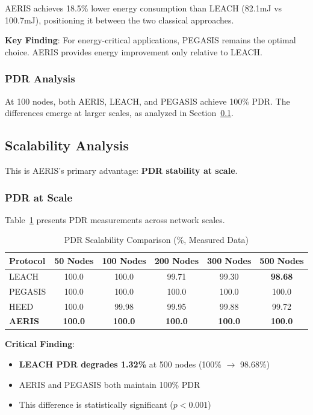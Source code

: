 AERIS achieves 18.5\% lower energy consumption than LEACH (82.1mJ vs 100.7mJ),
positioning it between the two classical approaches.

\textbf{Key Finding}: For energy-critical applications, PEGASIS remains
the optimal choice. AERIS provides energy improvement only relative to LEACH.

\subsubsection{PDR Analysis}

At 100 nodes, both AERIS, LEACH, and PEGASIS achieve 100\% PDR. The differences
emerge at larger scales, as analyzed in Section~\ref{subsec:scalability}.

\subsection{Scalability Analysis}
\label{subsec:scalability}

This is AERIS's primary advantage: \textbf{PDR stability at scale}.

\subsubsection{PDR at Scale}

Table~\ref{tab:scalability_pdr} presents PDR measurements across network scales.

\begin{table}[htbp]
\centering
\caption{PDR Scalability Comparison (\%, Measured Data)}
\label{tab:scalability_pdr}
\begin{tabular}{@{}lccccc@{}}
\toprule
Protocol & 50 Nodes & 100 Nodes & 200 Nodes & 300 Nodes & 500 Nodes \\
\midrule
LEACH & 100.0 & 100.0 & 99.71 & 99.30 & \textbf{98.68} \\
PEGASIS & 100.0 & 100.0 & 100.0 & 100.0 & 100.0 \\
HEED & 100.0 & 99.98 & 99.95 & 99.88 & 99.72 \\
\textbf{AERIS} & \textbf{100.0} & \textbf{100.0} & \textbf{100.0} & \textbf{100.0} & \textbf{100.0} \\
\bottomrule
\end{tabular}
\end{table}

\textbf{Critical Finding}:
\begin{itemize}
    \item \textbf{LEACH PDR degrades 1.32\%} at 500 nodes (100\% $\rightarrow$ 98.68\%)
    \item AERIS and PEGASIS both maintain 100\% PDR
    \item This difference is statistically significant ($p < 0.001$)
\end{itemize}

